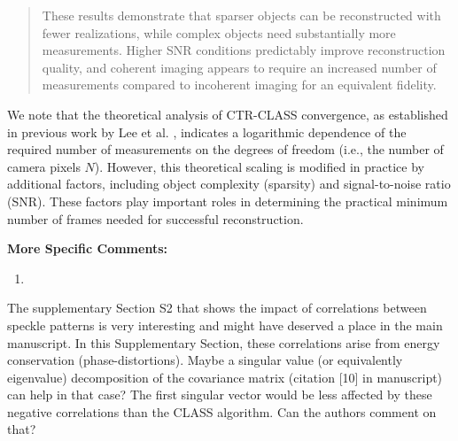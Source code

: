 \documentclass[12pt]{article}
\newenvironment{solved_reviewercomment}
    {\begin{tcolorbox}[width=\linewidth,colback=gray!5,colframe=solved_commentcolor!50,title=Reviewer Comment,left=5pt,right=5pt]}
    {\end{tcolorbox}}
\newenvironment{ourresponse}
    {\begin{tcolorbox}[width=\linewidth,breakable,enhanced,colback=gray!5,colframe=responsecolor!50,title=Response,left=5pt,right=5pt]}
    {\end{tcolorbox}}
\begin{document}
\begin{ourresponse}
\begin{quote}
        These results demonstrate that sparser objects can be reconstructed with fewer realizations, while complex objects need substantially more measurements. Higher SNR conditions predictably improve reconstruction quality, and coherent imaging appears to require an increased number of measurements compared to incoherent imaging for an equivalent fidelity.

                   
    \end{quote}

        We note that the theoretical analysis of CTR-CLASS convergence, as established in previous work by Lee et al. \cite{lee22}, indicates a logarithmic dependence of the required number of measurements on the degrees of freedom (i.e., the number of camera pixels $N$). However, this theoretical scaling is modified in practice by additional factors, including object complexity (sparsity) and signal-to-noise ratio (SNR). These factors play important roles in determining the practical minimum number of frames needed for successful reconstruction.


\end{ourresponse}



\textbf{More Specific Comments:}

\begin{enumerate}[label=\arabic*., resume]
\item \leavevmode
\end{enumerate}
\vspace{-1em}
\begin{solved_reviewercomment}
    The supplementary Section S2 that shows the impact of correlations between speckle patterns is very interesting and might have deserved a place in the main manuscript. In this Supplementary Section, these correlations arise from energy conservation (phase-distortions). Maybe a singular value (or equivalently eigenvalue) decomposition of the covariance matrix \cite{badon2020distortion}(citation [10] in manuscript) can help in that case? The first singular vector would be less affected by these negative correlations than the CLASS algorithm. Can the authors comment on that? 
\end{solved_reviewercomment}
\end{document}
